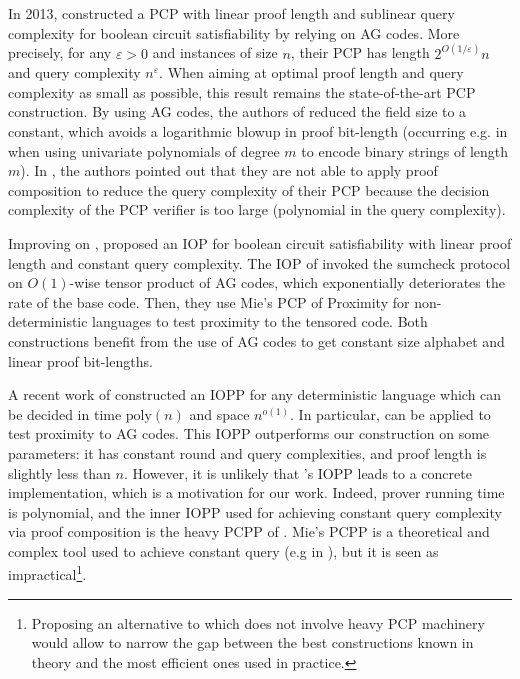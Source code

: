 \documentclass[10pt,a4paper]{article}
\renewcommand\epsilon{\varepsilon}
\theoremstyle{plain}
\theoremstyle{plain}
\theoremstyle{definition}
\theoremstyle{remark}
\theoremstyle{plain}
\begin{document}
In 2013, \cite{BKKMS13} constructed a PCP with linear proof length and sublinear query complexity for boolean circuit satisfiability by relying on AG codes. More precisely, for any $\epsilon > 0$ and instances of size $n$, their PCP has length $2^{O(1/\epsilon)}n$ and query complexity $n^\epsilon$. When aiming at optimal proof length and query complexity as small as possible, this result remains the state-of-the-art PCP construction. By using AG codes, the authors of \cite{BKKMS13} reduced the field size to a constant, which avoids a logarithmic blowup in proof bit-length (occurring e.g. in \cite{BS08} when using univariate polynomials of degree $m$ to encode binary strings of length $m$). 
In \cite{BKKMS13}, the authors pointed out that they are not able to apply proof composition \cite{AS92} to reduce the query complexity of their PCP because the decision complexity of the PCP verifier is too large (polynomial in the query complexity). 

Improving on \cite{BKKMS13}, \cite{BCGRS17} proposed an IOP for boolean circuit satisfiability with linear proof length and constant query complexity. The IOP of \cite{BCGRS17} invoked the sumcheck protocol \cite{LFKN90} on $O(1)$-wise tensor product of AG codes, which exponentially deteriorates the rate of the base code. Then, they use Mie's PCP of Proximity for non-deterministic languages \cite{Mie09} to test proximity to the tensored code. Both constructions benefit from the use of AG codes to get constant size alphabet and linear proof bit-lengths. 

A recent work of \cite{RR20} constructed an IOPP for any deterministic language which can be decided in time $\text{poly}(n)$ and space $n^{o(1)}$. In particular, \cite[Corollary~3.6]{RR20} can be applied to test proximity to AG codes. This IOPP outperforms our construction on some parameters: it has constant round and query complexities, and proof length is slightly less than $n$. However, it is unlikely that \cite{RR20}'s IOPP leads to a concrete implementation, which is a motivation for our work. Indeed, prover running time is polynomial, and the inner IOPP used for achieving constant query complexity via proof composition is the heavy PCPP of \cite{Mie09}. Mie's PCPP is a theoretical and complex tool used to achieve constant query (e.g in \cite{BCGRS17,BCGGRS19,BCL20}), but it is seen as impractical\footnote{Proposing an alternative to \cite{Mie09} which does not involve heavy PCP machinery would allow to narrow the gap between the best constructions known in theory and the most efficient ones used in practice.}.
\end{document}
